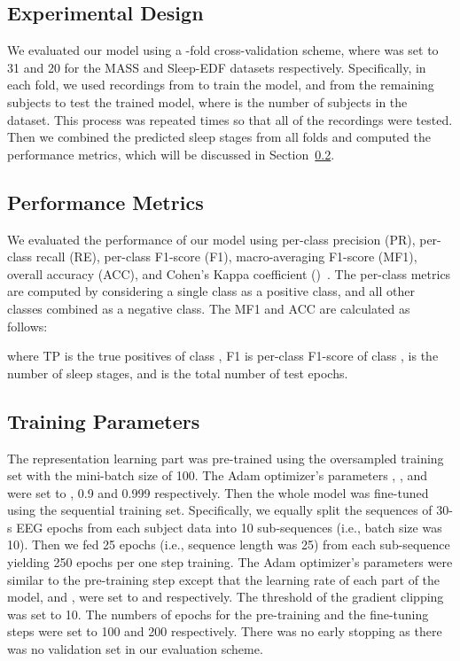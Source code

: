 \documentclass[journal,twoside]{IEEEtran}
\begin{document}
\subsection{Experimental Design} \label{sec:experimental_design}
We evaluated our model using a -fold cross-validation scheme, where  was set to 31 and 20 for the MASS and Sleep-EDF datasets respectively. Specifically, in each fold, we used recordings from  to train the model, and from the remaining  subjects to test the trained model, where  is the number of subjects in the dataset. This process was repeated  times so that all of the recordings were tested.
Then we combined the predicted sleep stages from all folds and computed the performance metrics, which will be discussed in Section~\ref{sec:performance_metric}.

\subsection{Performance Metrics} \label{sec:performance_metric}
We evaluated the performance of our model using per-class precision (PR), per-class recall (RE), per-class F1-score (F1), macro-averaging F1-score (MF1), overall accuracy (ACC), and Cohen's Kappa coefficient ()~\cite{cohen1960,sokolova2009}. The per-class metrics are computed by considering a single class as a positive class, and all other classes combined as a negative class. The MF1 and ACC are calculated as follows:

where TP is the true positives of class , F1 is per-class F1-score of class ,  is the number of sleep stages, and  is the total number of test epochs.

\subsection{Training Parameters} \label{sec:training_params}
The representation learning part was pre-trained using the oversampled training set with the mini-batch size of 100. The Adam optimizer's parameters , , and  were set to , 0.9 and 0.999 respectively. Then the whole model was fine-tuned using the sequential training set. Specifically, we equally split the sequences of 30-s EEG epochs from each subject data into 10 sub-sequences (i.e., batch size was 10). Then we fed 25 epochs (i.e., sequence length was 25) from each sub-sequence yielding 250 epochs per one step training. The Adam optimizer's parameters were similar to the pre-training step except that the learning rate of each part of the model,  and , were set to  and  respectively. The threshold of the gradient clipping was set to 10. The numbers of epochs for the pre-training and the fine-tuning steps were set to 100 and 200 respectively. There was no early stopping as there was no validation set in our evaluation scheme.
\end{document}
